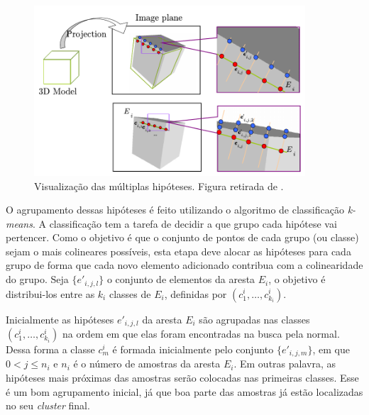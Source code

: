 \begin{figure}[!ht]
\centering\includegraphics[width=0.9\textwidth]{monografia/multiplas_hipoteses_celine}
\caption{Visualização das múltiplas hipóteses. Figura retirada de \cite{celine}.}
\label{multiplas_hipoteses_celine}
\end{figure}

O agrupamento dessas hipóteses é feito utilizando o algoritmo de classificação \emph{k-means}. A classificação tem a tarefa de decidir a que grupo cada hipótese vai pertencer. Como o objetivo é que o conjunto de pontos de cada grupo (ou classe) sejam o mais colineares possíveis, esta etapa deve alocar as hipóteses para cada grupo de forma que cada novo elemento adicionado contribua com a colinearidade do grupo. Seja $\{e'_{i,j,l}\}$ o conjunto de elementos da aresta $E_i$, o objetivo é distribui-los entre as $k_i$ classes de $E_i$, definidas por $(c^i_1, \dots, c^i_{k_i})$.



Inicialmente as hipóteses $e'_{i,j,l}$ da aresta $E_i$ são agrupadas nas classes $(c^i_1, \dots, c^i_{k_i})$ na ordem em que elas foram encontradas na busca pela normal. Dessa forma a classe $c^i_m$ é formada inicialmente pelo conjunto $\{e'_{i,j,m}\}$, em que $0 < j \leq n_i$ e $n_i$ é o número de amostras da aresta $E_i$. Em outras palavra, as hipóteses mais próximas das amostras serão colocadas nas primeiras classes. Esse é um bom agrupamento inicial, já que boa parte das amostras já estão localizadas no seu \emph{cluster} final.


